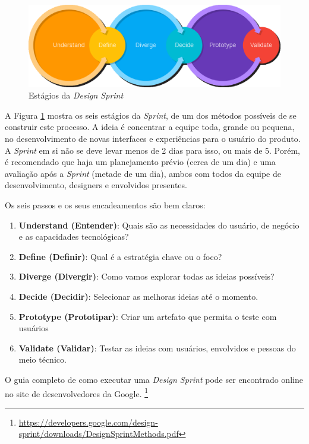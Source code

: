 \begin{figure}[!htb]
	\centering
    \includegraphics[keepaspectratio=true,scale=0.45]
    {figuras/home-DS-flow-ill.eps}
  \caption{Estágios da \textit{Design Sprint}}
  \label{fig:home-DS-flow-ill}
\end{figure}

\newpage

A Figura \ref{fig:home-DS-flow-ill} mostra os seis estágios da \textit{Sprint},
de um dos métodos possíveis de se construir este processo. A ideia é concentrar
a equipe toda, grande ou pequena, no desenvolvimento de novas interfaces e
experiências para o usuário do produto. A \textit{Sprint} em si não se deve
levar menos de 2 dias para isso, ou mais de 5. Porém, é recomendado que haja um
planejamento prévio (cerca de um dia) e uma avaliação após a \textit{Sprint}
(metade de um dia), ambos com todos da equipe de desenvolvimento, designers e
envolvidos presentes.

Os seis passos e os seus encadeamentos são bem claros:
\begin{enumerate}
  \item \textbf{Understand (Entender)}: Quais são as necessidades do usuário, de
	negócio e as capacidades tecnológicas?
	\item \textbf{Define (Definir)}: Qual é a estratégia chave ou o foco?
	\item \textbf{Diverge (Divergir)}: Como vamos explorar todas as ideias
	possíveis?
	\item \textbf{Decide (Decidir)}: Selecionar as melhoras ideias até o momento.
	\item \textbf{Prototype (Prototipar)}: Criar um artefato que permita o teste
	com usuários
	\item \textbf{Validate (Validar)}: Testar as ideias com usuários, envolvidos e
	pessoas do meio técnico.
\end{enumerate}

O guia completo de como executar uma \textit{Design Sprint} pode ser encontrado
online no site de desenvolvedores da Google.
\footnote{\url{https://developers.google.com/design-sprint/downloads/DesignSprintMethods.pdf}}

